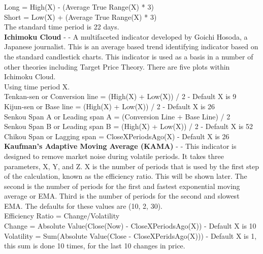 \documentclass[conference]{IEEEtran}
\begin{document}
\noindent
Long = High(X) - (Average True Range(X) * 3)\\
Short = Low(X) + (Average True Range(X) * 3)\\
\noindent
The standard time period is 22 days.\\

\noindent
\textbf{Ichimoku Cloud} - \cite{Murphy1999} - A multifaceted indicator developed by Goichi Hosoda, a Japanese journalist. This is an average based trend identifying indicator based on the standard candlestick charts. This indicator is used as a basis in a number of other theories including Target Price Theory. There are five plots within Ichimoku Cloud.\\

\noindent
Using time period X.\\
Tenkan-sen or Conversion line = (High(X) + Low(X)) / 2  - Default X is 9 \\
Kijun-sen or Base line = (High(X) + Low(X)) / 2 - Default X is 26 \\
Senkou Span A or Leading span A = (Conversion Line + Base Line) / 2 \\
Senkou Span B or Leading span B = (High(X) + Low(X)) / 2 - Default X is 52 \\
Chikou Span or Lagging span = CloseXPeriodsAgo(X) - Default X is 26\\

\noindent
\textbf{Kaufman's Adaptive Moving Average (KAMA)} - \cite{Kaufman1998} - This indicator is designed to remove market noise during volatile periods. It takes three parameters, X, Y, and Z. X is the number of periods that is used by the first step of the calculation, known as the efficiency ratio. This will be shown later. The second is the number of periods for the first and fastest exponential moving average or EMA. Third is the number of periods for the second and slowest EMA. The defaults for these values are (10, 2, 30). \\

\noindent
Efficiency Ratio = Change/Volatility\\
Change = Absolute Value(Close(Now) - CloseXPeriodsAgo(X)) - Default X is 10 \\
Volatility = Sum(Absolute Value(Close - CloseXPeridsAgo(X))) - Default X is 1, this sum is done 10 times, for the last 10 changes in price.\\
\end{document}
